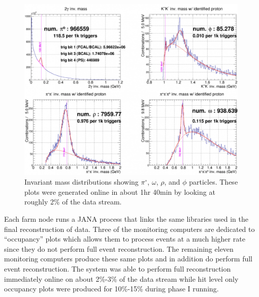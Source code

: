 \begin{figure}[tbp]
\begin{center}
\includegraphics[width=0.99\textwidth]{figures/online_monitoring_PID.png}
\caption{\label{fig:online_monitoring_PID}Invariant mass distributions showing $\pi^\circ$, $\omega$, $\rho$, and $\phi$ particles. These plots were generated online in about 1hr 40min by looking at roughly 2\% of the data stream.}   
\end{center}  
\end{figure}


Each farm node runs a JANA\cite{jana_v0_8_1b} process that links the same \GX libraries used in the final reconstruction of \GX data. Three of the monitoring computers are dedicated to ``occupancy'' plots which allows them to process events at a much higher rate since they do not perform full event reconstruction. The remaining eleven monitoring computers produce these same plots and in addition do perform full event reconstruction. The system was able to perform full reconstruction immediately online on about 2\%-3\% of the data stream while hit level only occupancy plots were produced for 10\%-15\% during phase I \GX running.


